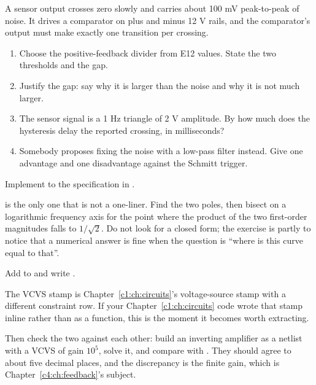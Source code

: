 \label{c3:ex:5}
A sensor output crosses zero slowly and carries about 100 mV peak-to-peak of noise. It drives a comparator on plus and minus 12 V rails, and the comparator's output must make exactly one transition per crossing.

\begin{enumerate}
  \item Choose the positive-feedback divider from E12 values. State the two thresholds and the gap.
  \item Justify the gap: say why it is larger than the noise and why it is not much larger.
  \item The sensor signal is a 1 Hz triangle of 2 V amplitude. By how much does the hysteresis delay the reported crossing, in milliseconds?
  \item Somebody proposes fixing the noise with a low-pass filter instead. Give one advantage and one disadvantage against the Schmitt trigger.
\end{enumerate}

\label{c3:ex:6}
Implement  to the specification in .

 is the only one that is not a one-liner. Find the two poles, then bisect on a logarithmic frequency axis for the point where the product of the two first-order magnitudes falls to $1/\sqrt{2}$. Do not look for a closed form; the exercise is partly to notice that a numerical answer is fine when the question is ``where is this curve equal to that''.

\label{c3:ex:7}
Add  to  and write .

The VCVS stamp is Chapter~\ref{c1:ch:circuits}'s voltage-source stamp with a different constraint row. If your Chapter~\ref{c1:ch:circuits} code wrote that stamp inline rather than as a function, this is the moment it becomes worth extracting.

Then check the two against each other: build an inverting amplifier as a netlist with a VCVS of gain $10^5$, solve it, and compare with . They should agree to about five decimal places, and the discrepancy is the finite gain, which is Chapter~\ref{c4:ch:feedback}'s subject.

